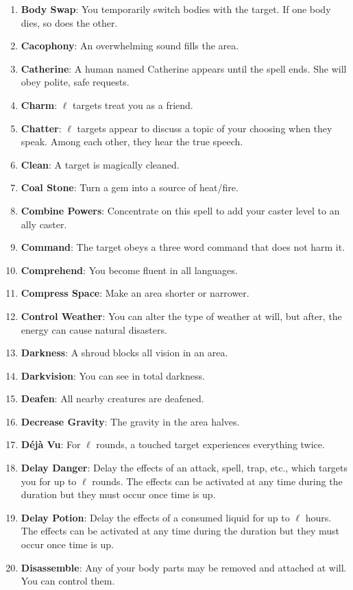 \documentclass[twoside]{article}
\begin{document}
\begin{enumerate}[nosep]
\item \textbf{Body Swap}: You temporarily switch bodies with the target. If one body dies, so does the other.
\item \textbf{Cacophony}: An overwhelming sound fills the area.
\item \textbf{Catherine}: A human named Catherine appears until the spell ends. She will obey polite, safe requests.
\item \textbf{Charm}: $\ell$ targets treat you as a friend.
\item \textbf{Chatter}: $\ell$ targets appear to discuss a topic of your choosing when they speak. Among each other, they hear the true speech.
\item \textbf{Clean}: A target is magically cleaned.
\item \textbf{Coal Stone}: Turn a gem into a source of heat/fire.
\item \textbf{Combine Powers}: Concentrate on this spell to add your caster level to an ally caster.
\item \textbf{Command}: The target obeys a three word command that does not harm it.
\item \textbf{Comprehend}: You become fluent in all languages.
\item \textbf{Compress Space}: Make an area shorter or narrower.
\item \textbf{Control Weather}: You can alter the type of weather at will, but after, the energy can cause natural disasters.
\item \textbf{Darkness}: A shroud blocks all vision in an area.
\item \textbf{Darkvision}: You can see in total darkness.
\item \textbf{Deafen}: All nearby creatures are deafened.
\item \textbf{Decrease Gravity}: The gravity in the area halves.
\item \textbf{D\'ej\`a Vu}: For $\ell$ rounds, a touched target experiences everything twice.
\item \textbf{Delay Danger}: Delay the effects of an attack, spell, trap, etc., which targets you for up to $\ell$ rounds. The effects can be activated at any time during the duration but they must occur once time is up.
\item \textbf{Delay Potion}: Delay the effects of a consumed liquid for up to $\ell$ hours. The effects can be activated at any time during the duration but they must occur once time is up.
\item \textbf{Disassemble}: Any of your body parts may be removed and attached at will. You can control them.

\end{enumerate}
\end{document}

